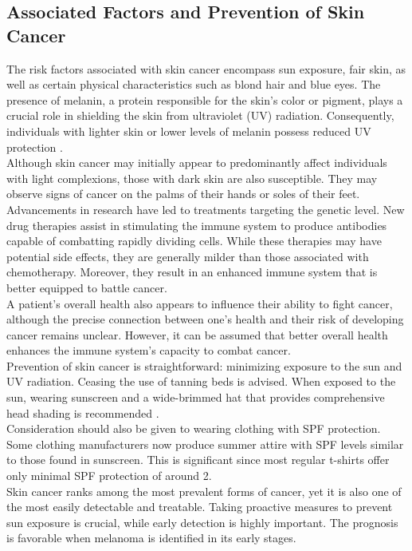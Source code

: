 \subsection{Associated Factors and Prevention of Skin Cancer}

The risk factors associated with skin cancer encompass sun exposure, fair skin,
as well as certain physical characteristics such as blond hair and blue eyes.
The presence of melanin, a protein responsible for the skin's color or pigment,
plays a crucial role in shielding the skin from ultraviolet (UV) radiation.
Consequently, individuals with lighter skin or lower levels of melanin possess
reduced UV protection \cite{OrigenAndTreatment}. \\

Although skin cancer may initially appear to predominantly affect individuals
with light complexions, those with dark skin are also susceptible. They may
observe signs of cancer on the palms of their hands or soles of their feet.
\\

Advancements in research have led to treatments targeting the genetic level.
New drug therapies assist in stimulating the immune system to produce
antibodies capable of combatting rapidly dividing cells. While these therapies
may have potential side effects, they are generally milder than those
associated with chemotherapy. Moreover, they result in an enhanced immune
system that is better equipped to battle cancer. \\

A patient's overall health also appears to influence their ability to fight
cancer, although the precise connection between one's health and their risk of
developing cancer remains unclear. However, it can be assumed that better
overall health enhances the immune system's capacity to combat cancer. \\

Prevention of skin cancer is straightforward: minimizing exposure to the sun
and UV radiation. Ceasing the use of tanning beds is advised. When exposed to
the sun, wearing sunscreen and a wide-brimmed hat that provides comprehensive
head shading is recommended \cite{OrigenAndTreatment}. \\

Consideration should also be given to wearing clothing with SPF protection.
Some clothing manufacturers now produce summer attire with SPF levels similar
to those found in sunscreen. This is significant since most regular t-shirts
offer only minimal SPF protection of around 2. \\

Skin cancer ranks among the most prevalent forms of cancer, yet it is also one
of the most easily detectable and treatable. Taking proactive measures to
prevent sun exposure is crucial, while early detection is highly important. The
prognosis is favorable when melanoma is identified in its early stages.
